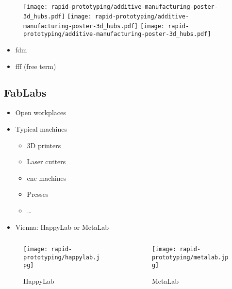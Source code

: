 \documentclass[aspectratio=169]{beamer}
\begin{document}
\subsection{}
\begin{frame}
    \begin{figure}
        \texttt{[image: rapid-prototyping/additive-manufacturing-poster-3d\_hubs.pdf]}
        \texttt{[image: rapid-prototyping/additive-manufacturing-poster-3d\_hubs.pdf]}
        \texttt{[image: rapid-prototyping/additive-manufacturing-poster-3d\_hubs.pdf]}
        \caption{}
    \end{figure}
    \begin{itemize}
        \item \gls{fdm} \texttrademark
        \item \gls{fff} (free term)
    \end{itemize}
\end{frame}

\subsection{FabLabs}
\begin{frame}
    \begin{itemize}
        \item Open workplaces
        \item Typical machines
              \begin{itemize}
                  \item 3D printers
                  \item Laser cutters
                  \item \acs{cnc} machines
                  \item Presses
                  \item \ldots
              \end{itemize}
        \item Vienna: HappyLab or MetaLab
    \end{itemize}
    \begin{columns}
        \begin{column}{0.55\textwidth}
            \begin{figure}
                \texttt{[image: rapid-prototyping/happylab.jpg]}
                \caption{HappyLab}
            \end{figure}
        \end{column}
        \begin{column}{0.45\textwidth}
            \begin{figure}
                \texttt{[image: rapid-prototyping/metalab.jpg]}
                \caption{MetaLab}
            \end{figure}
        \end{column}
    \end{columns}
\end{frame}
\end{document}
